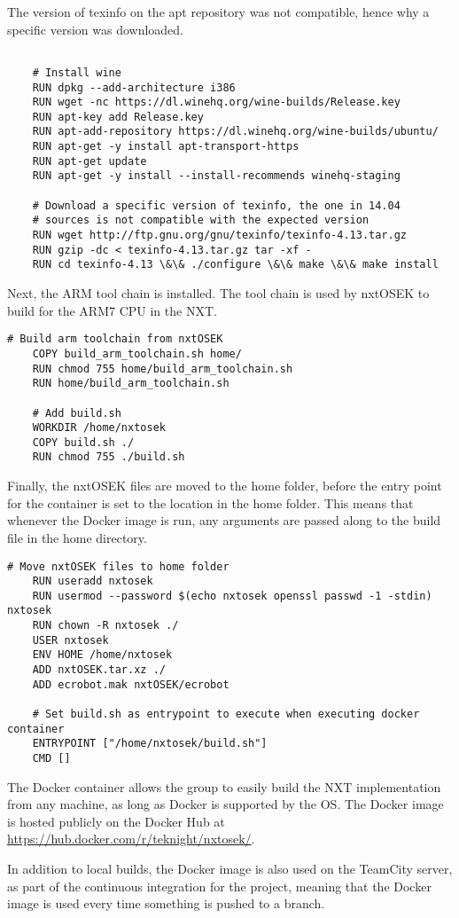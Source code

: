 The version of texinfo on the apt repository was not compatible, hence why a specific version was downloaded.

\begin{lstlisting}[language=docker,label={lst:dockerimplementation2},caption={Installation of Wine and texinfo}]

    # Install wine
    RUN dpkg --add-architecture i386
    RUN wget -nc https://dl.winehq.org/wine-builds/Release.key
    RUN apt-key add Release.key
    RUN apt-add-repository https://dl.winehq.org/wine-builds/ubuntu/
    RUN apt-get -y install apt-transport-https
    RUN apt-get update
    RUN apt-get -y install --install-recommends winehq-staging
    
    # Download a specific version of texinfo, the one in 14.04 
    # sources is not compatible with the expected version
    RUN wget http://ftp.gnu.org/gnu/texinfo/texinfo-4.13.tar.gz
    RUN gzip -dc < texinfo-4.13.tar.gz tar -xf -
    RUN cd texinfo-4.13 \&\& ./configure \&\& make \&\& make install
\end{lstlisting} 
Next, the ARM tool chain is installed.
The tool chain is used by nxtOSEK to build for the ARM7 CPU in the NXT.
\begin{lstlisting}[language=docker,label={lst:dockerimplementation3},caption={Building the ARM toolchain}]
    # Build arm toolchain from nxtOSEK
    COPY build_arm_toolchain.sh home/
    RUN chmod 755 home/build_arm_toolchain.sh
    RUN home/build_arm_toolchain.sh
    
    # Add build.sh
    WORKDIR /home/nxtosek
    COPY build.sh ./
    RUN chmod 755 ./build.sh
\end{lstlisting}

Finally, the nxtOSEK files are moved to the home folder, before the entry point for the container is set to the location in the home folder.
This means that whenever the Docker image is run, any arguments are passed along to the build file in the home directory.

\begin{lstlisting}[language=docker,label={lst:dockerimplementation4},caption={Moving the nxtOSEK files and setting the entrypoint}]   
    # Move nxtOSEK files to home folder
    RUN useradd nxtosek
    RUN usermod --password $(echo nxtosek openssl passwd -1 -stdin) nxtosek
    RUN chown -R nxtosek ./
    USER nxtosek
    ENV HOME /home/nxtosek
    ADD nxtOSEK.tar.xz ./
    ADD ecrobot.mak nxtOSEK/ecrobot
    
    # Set build.sh as entrypoint to execute when executing docker container
    ENTRYPOINT ["/home/nxtosek/build.sh"]
    CMD []    
\end{lstlisting}

The Docker container allows the group to easily build the NXT implementation from any machine, as long as Docker is supported by the OS.
The Docker image is hosted publicly on the Docker Hub at \url{https://hub.docker.com/r/teknight/nxtosek/}.

In addition to local builds, the Docker image is also used on the TeamCity server, as part of the continuous integration for the project, meaning that the Docker image is used every time something is pushed to a branch.


